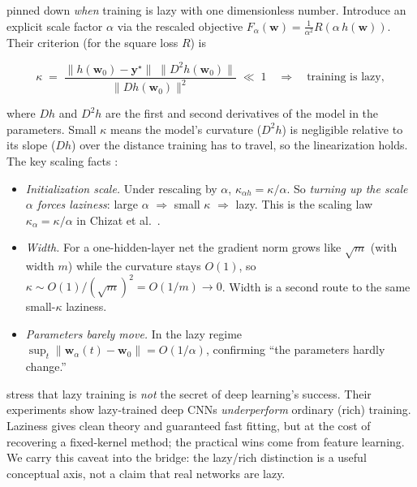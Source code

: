 \citet{chizat2019} pinned down \emph{when} training is lazy with one
dimensionless number. Introduce an explicit scale factor $\alpha$ via the
rescaled objective $F_\alpha(\mathbf{w}) = \tfrac{1}{\alpha^2}
R(\alpha\,h(\mathbf{w}))$. Their criterion (for the square loss $R$) is

\begin{equation}
\label{eq:kappa}
  \kappa \;=\; \frac{\|h(\mathbf{w}_0)-\mathbf{y}^\star\|\;\|D^2 h(\mathbf{w}_0)\|}
                    {\|D h(\mathbf{w}_0)\|^2} \;\ll\; 1
  \quad\Longrightarrow\quad \text{training is lazy},
\end{equation}

where $D h$ and $D^2 h$ are the first and second derivatives of the model
in the parameters. Small $\kappa$ means the model's curvature ($D^2 h$) is
negligible relative to its slope ($Dh$) over the distance training has to
travel, so the linearization holds. The key scaling facts
\citep{chizat2019}:
\begin{itemize}[nosep]
\item \emph{Initialization scale.} Under rescaling by $\alpha$,
  $\kappa_{\alpha h} = \kappa / \alpha$. So \emph{turning up the scale
  $\alpha$ forces laziness}: large $\alpha$ $\Rightarrow$ small $\kappa$
  $\Rightarrow$ lazy. This is the scaling law $\kappa_\alpha = \kappa/\alpha$
  in Chizat et al.\ \citep{chizat2019}.
\item \emph{Width.} For a one-hidden-layer net the gradient norm grows like
  $\sqrt{m}$ (with width $m$) while the curvature stays $O(1)$, so
  $\kappa\sim O(1)/(\sqrt{m})^2 = O(1/m)\to 0$. Width is a second route to
  the same small-$\kappa$ laziness.
\item \emph{Parameters barely move.} In the lazy regime
  $\sup_t\|\mathbf{w}_\alpha(t)-\mathbf{w}_0\| = O(1/\alpha)$, confirming
  ``the parameters hardly change.''
\end{itemize}

\begin{remark}
\citet{chizat2019} stress that lazy training is \emph{not} the secret of
deep learning's success. Their experiments show lazy-trained deep CNNs
\emph{underperform} ordinary (rich) training. Laziness gives clean theory
and guaranteed fast fitting, but at the cost of recovering a fixed-kernel
method; the practical wins come from feature learning. We carry this
caveat into the bridge: the lazy/rich distinction is a useful conceptual
axis, not a claim that real networks are lazy.
\end{remark}

